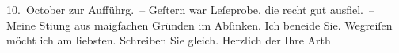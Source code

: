 \begin{ledgroupsized}[t]{13cm}
                  10. October zur Aufführg. – Geſtern war Leſeprobe, die recht
               gut ausfiel. – Meine Sti{\geminationm}ung aus ma{\geminationn}igfachen Gründen im Abſinken. Ich beneide Sie.
               Wegreiſen möcht ich am liebsten. Schreiben Sie gleich. Herzlich der Ihre
                  \spacefill\mbox{Arth}\pend
           \endnumbering{}\end{ledgroupsized}  \newcommand{\dateiname}{L00487}\newcommand{\titel}{Arthur Schnitzler an Richard Beer-Hofmann, 19. 9. 1895}\newcommand{\editorInnen}{Martin Anton Müller und Gerd-Hermann Susen}
      